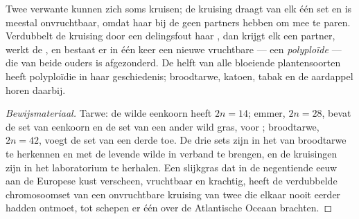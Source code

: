 \begin{proposition}\label{prop:g12:diversification-of-life:polyploidy}
Twee verwante  kunnen zich soms kruisen; de kruising draagt van
elk één set  en is meestal onvruchtbaar, omdat haar
 bij de  geen partners hebben om mee te paren.
Verdubbelt de kruising door een delingsfout haar , dan krijgt
elk  een partner, werkt de , en bestaat er in één keer een
nieuwe vruchtbare  --- een \emph{polyploïde} ---
die van beide ouders is afgezonderd. De helft van alle bloeiende
plantensoorten heeft polyploïdie in haar geschiedenis; broodtarwe, katoen,
tabak en de aardappel horen daarbij.
\end{proposition}
\begin{proof}[Bewijsmateriaal]
Tarwe: de wilde eenkoorn heeft $2n = 14$; emmer, $2n = 28$, bevat de set
van eenkoorn en de set van een ander wild gras,  voor
; broodtarwe, $2n = 42$, voegt de set van een derde toe. De drie
sets zijn in het  van broodtarwe te herkennen en met de levende
wilde  in verband te brengen, en de kruisingen zijn in het
laboratorium te herhalen. Een slijkgras dat in de negentiende eeuw aan de
Europese kust verscheen, vruchtbaar en krachtig, heeft de verdubbelde
chromosoomset van een onvruchtbare kruising van twee  die elkaar
nooit eerder hadden ontmoet, tot schepen er één over de Atlantische Oceaan
brachten.
\end{proof}

